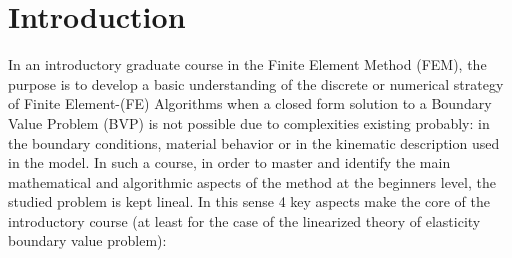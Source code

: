 \graphicspath{ {./img/intro/} }

\chapter{Introduction}

In an introductory graduate course in the Finite Element Method (FEM), the purpose is to develop a basic understanding of the discrete or numerical strategy of Finite Element-(FE) Algorithms when a closed form solution to a Boundary Value Problem (BVP) is not possible due to complexities existing probably: in the boundary conditions, material behavior or in the kinematic description used in the model. In such a course, in order to master and identify the main mathematical and algorithmic aspects of the method at the beginners level, the studied problem is kept lineal. In this sense 4 key aspects make the core of the introductory course (at least for the case of the linearized theory of elasticity boundary value problem):

